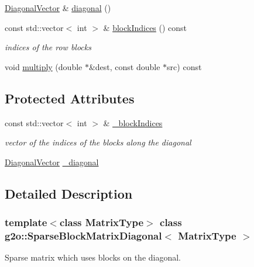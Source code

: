 \begin{DoxyCompactItemize}
\mbox{\hyperlink{classg2o_1_1_sparse_block_matrix_diagonal_a2eb7fc4130fac5c499b57f3bec855812}{Diagonal\+Vector}} \& \mbox{\hyperlink{classg2o_1_1_sparse_block_matrix_diagonal_af75593896065195f7dc2342132c565cc}{diagonal}} ()
\item 
const std\+::vector$<$ int $>$ \& \mbox{\hyperlink{classg2o_1_1_sparse_block_matrix_diagonal_aa900034ca8db34a7e2d2d51973cfceff}{block\+Indices}} () const
\begin{DoxyCompactList}\small\item\em indices of the row blocks \end{DoxyCompactList}\item 
void \mbox{\hyperlink{classg2o_1_1_sparse_block_matrix_diagonal_ae7d969c12506cdcd1b7d54128f3b6985}{multiply}} (double $\ast$\&dest, const double $\ast$src) const
\end{DoxyCompactItemize}
\subsection*{Protected Attributes}
\begin{DoxyCompactItemize}
\item 
const std\+::vector$<$ int $>$ \& \mbox{\hyperlink{classg2o_1_1_sparse_block_matrix_diagonal_a12ca3362997c3ca21c8b2a203177485e}{\+\_\+block\+Indices}}
\begin{DoxyCompactList}\small\item\em vector of the indices of the blocks along the diagonal \end{DoxyCompactList}\item 
\mbox{\hyperlink{classg2o_1_1_sparse_block_matrix_diagonal_a2eb7fc4130fac5c499b57f3bec855812}{Diagonal\+Vector}} \mbox{\hyperlink{classg2o_1_1_sparse_block_matrix_diagonal_a0679df785f9e7b79a1e9dfe623af5341}{\+\_\+diagonal}}
\end{DoxyCompactItemize}


\subsection{Detailed Description}
\subsubsection*{template$<$class Matrix\+Type$>$\newline
class g2o\+::\+Sparse\+Block\+Matrix\+Diagonal$<$ Matrix\+Type $>$}

Sparse matrix which uses blocks on the diagonal. 

